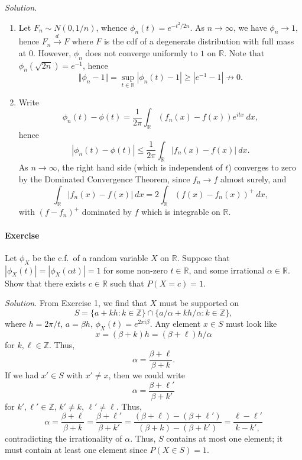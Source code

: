 \documentclass[10pt]{article}
\newcounter{prob}
\newcommand{\problem}{\stepcounter{prob}\paragraph{Exercise \arabic{prob}}}
\newcommand{\solution}{\textit{Solution.} }
\newcommand{\R}{\mathbb{R}}
\newcommand{\Z}{\mathbb{Z}}
\newcommand{\tod}{\overset{d\,}{\longrightarrow}}
\begin{document}
    \solution \begin{enumerate}
        \item Let $F_n \sim N(0, 1 / n)$, whence $\phi_n(t) = e^{-t^2 / 2n}$. As $n
        \to \infty$, we have $\phi_n \to 1$, hence $F_n \tod F$ where $F$ is the cdf
        of a degenerate distribution with full mass at $0$. However, $\phi_n$ does
        not converge uniformly to $1$ on $\R$. Note that $\phi_n(\sqrt{2n}) =
        e^{-1}$, hence \[
            \Vert \phi_n - 1\Vert = \sup_{t \in \R} |\phi_n(t) - 1| \geq |e^{-1} - 1|
            \not\to 0.
        \]

        \item Write \[
            \phi_n(t) - \phi(t) = \frac{1}{2\pi} \int_\R (f_n(x) - f(x))e^{itx} \:dx,
        \] hence \[
            |\phi_n(t) - \phi(t)| \leq \frac{1}{2\pi} \int_\R |f_n(x) - f(x)|\:dx.
        \] As $n \to \infty$, the right hand side (which is independent of $t$)
        converges to zero by the Dominated Convergence Theorem, since $f_n \to f$
        almost surely, and \[
            \int_\R |f_n(x) - f(x)| \:dx = 2\int_\R (f(x) - f_n(x))^+ \:dx,
        \] with $(f - f_n)^+$ dominated by $f$ which is integrable on $\R$.
    \end{enumerate}


    \problem Let $\phi_X$ be the c.f.\ of a random variable $X$ on $\R$. Suppose that
    $|\phi_X(t)| = |\phi_X(\alpha t)| = 1$ for some non-zero $t \in \R$, and some
    irrational $\alpha \in \R$. Show that there exists $c \in \R$ such that $P(X = c)
    = 1$.

    \solution From Exercise 1, we find that $X$ must be supported on \[
        S = \{a + kh: k \in \Z\} \cap \{a / \alpha + kh / \alpha : k \in \Z\},
    \] where $h = 2\pi / t$, $a = \beta h$, $\phi_X(t) = e^{2\pi i \beta}$. Any
    element $x \in S$ must look like \[
        x = (\beta + k)h = (\beta + \ell) h / \alpha
    \] for $k, \ell \in \Z$. Thus, \[
        \alpha = \frac{\beta + \ell}{\beta + k}.
    \] If we had $x' \in S$ with $x' \neq x$, then we could write \[
        \alpha = \frac{\beta + \ell'}{\beta + k'}
    \] for $k', \ell' \in \Z$, $k' \neq k$, $\ell' \neq \ell$. Thus, \[
        \alpha = \frac{\beta + \ell}{\beta + k} = \frac{\beta + \ell'}{\beta + k'} =
        \frac{(\beta + \ell) - (\beta + \ell')}{(\beta + k) - (\beta + k')} =
        \frac{\ell - \ell'}{k - k',}
    \] contradicting the irrationality of $\alpha$. Thus, $S$ contains at most one
    element; it must contain at least one element since $P(X \in S) = 1$.
\end{document}
